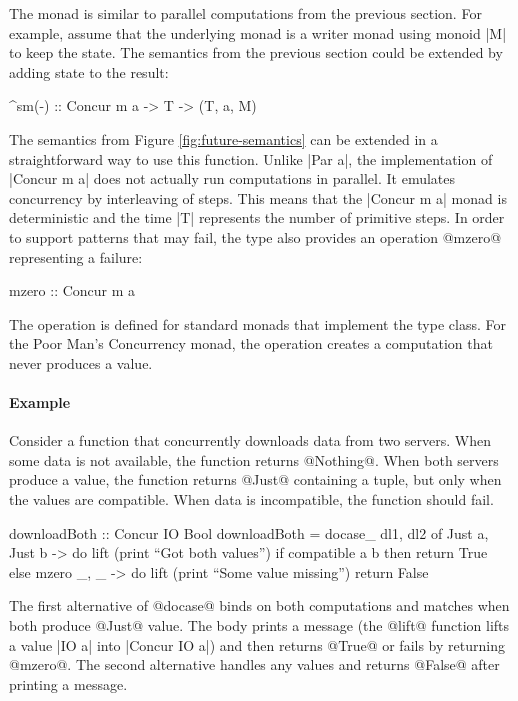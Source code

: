 \documentclass[preprint]{sigplanconf}
\begin{document}
The monad is similar to parallel computations from the previous section. For example, assume
that the underlying monad is a writer monad using monoid |M| to keep the state. The semantics from 
the previous section could be extended by adding state to the result:

\begin{code}
^sm(-) :: Concur m a -> T -> (T, a, M)
\end{code}
The semantics from Figure \ref{fig:future-semantics} can be extended in a straightforward way to use
this function. Unlike |Par a|, the implementation of |Concur m a| does not actually run computations in 
parallel. It emulates concurrency by interleaving of steps. This means that the |Concur m a| monad is 
deterministic and the time |T| represents the number of primitive steps. In order to support patterns 
that may fail, the type also provides an operation @mzero@ representing a failure:

\begin{code}
mzero :: Concur m a
\end{code}
The operation is defined for standard monads that implement the  type class. For the
Poor Man's Concurrency monad, the operation creates a computation that never produces a value.

\paragraph{Example} Consider a function that concurrently downloads data from two servers. When some
data is not available, the function returns @Nothing@. When both servers produce a value, the function
returns @Just@ containing a tuple, but only when the values are compatible. When data is incompatible,
the function should fail.

\begin{code}
downloadBoth :: Concur IO Bool
downloadBoth = docase_ dl1, dl2 of
  Just a, Just b -> do
    lift (print ``Got both values'')
    if compatible a b then return True else mzero
  _, _ -> do
    lift (print ``Some value missing'')
    return False
\end{code}
The first alternative of @docase@ binds on both computations and matches when both produce @Just@ value.
The body prints a message (the @lift@ function lifts a value |IO a| into |Concur IO a|) and then 
returns @True@ or fails by returning @mzero@. The second alternative handles any values and returns 
@False@ after printing a message.
\end{document}
